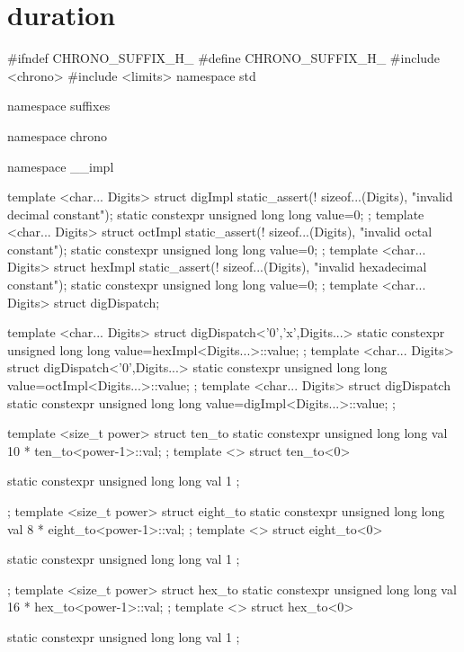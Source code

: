 \documentclass[ebook,11pt,article]{memoir}
\begin{document}
\section{duration}

\begin{codeblock}
#ifndef CHRONO_SUFFIX_H_
#define CHRONO_SUFFIX_H_
#include <chrono>
#include <limits>
namespace std {
namespace suffixes {
namespace chrono {

namespace __impl {

template <char... Digits>
struct digImpl{
	static_assert(! sizeof...(Digits), "invalid decimal constant");
	static constexpr unsigned long long value=0;
};
template <char... Digits>
struct octImpl{
	static_assert(! sizeof...(Digits), "invalid octal constant");
	static constexpr unsigned long long value=0;
};
template <char... Digits>
struct hexImpl{
	static_assert(! sizeof...(Digits), "invalid hexadecimal constant");
	static constexpr unsigned long long value=0;
};
template <char... Digits>
struct digDispatch;

template <char... Digits>
struct digDispatch<'0','x',Digits...>{
	static constexpr unsigned long long value=hexImpl<Digits...>::value;
};
template <char... Digits>
struct digDispatch<'0',Digits...>{
	static constexpr unsigned long long value=octImpl<Digits...>::value;
};
template <char... Digits>
struct digDispatch{
	static constexpr unsigned long long value=digImpl<Digits...>::value;
};


template <size_t power>
struct ten_to{
static constexpr unsigned long long 	val{ 10 * ten_to<power-1>::val};
};
template <>
struct ten_to<0>{
	static constexpr unsigned long long 	val{ 1 };

};
template <size_t power>
struct eight_to{
static constexpr unsigned long long 	val{ 8 * eight_to<power-1>::val};
};
template <>
struct eight_to<0>{
	static constexpr unsigned long long 	val{ 1 };

};
template <size_t power>
struct hex_to{
static constexpr unsigned long long 	val{ 16 * hex_to<power-1>::val};
};
template <>
struct hex_to<0>{
	static constexpr unsigned long long 	val{ 1 };

}}}}}
\end{codeblock}
\end{document}
